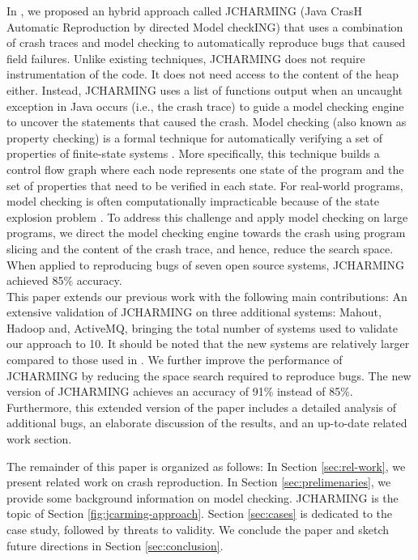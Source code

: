 \documentclass[times]{smrauth}
\begin{document}
In  \cite{Nayrolles2015}, we proposed an hybrid approach called JCHARMING
(Java CrasH Automatic Reproduction by directed Model
checkING) that uses a combination of crash traces and model
checking to automatically reproduce bugs that caused field
failures. Unlike existing techniques, JCHARMING does not
require instrumentation of the code. It does not need access to
the content of the heap either. Instead, JCHARMING uses a
list of functions output when an uncaught exception in Java
occurs (i.e., the crash trace) to guide a model checking engine
to uncover the statements that caused the crash. 
Model checking (also known as property checking) is a formal
technique for automatically verifying a set of properties of
finite-state systems \cite{Baier2008}. More specifically, this technique
builds a control flow graph where each node represents one
state of the program and the set of properties that need to be
verified in each state. For real-world programs, model
checking is often computationally impracticable because of
the state explosion problem \cite{Baier2008}. To address this challenge and
apply model checking on large programs, we direct the model
checking engine towards the crash using program slicing and
the content of the crash trace, and hence, reduce the search
space. When applied to reproducing bugs of seven open source  systems, JCHARMING achieved  85\% accuracy. \\

This paper extends our previous work \cite{Nayrolles2015} with the following main contributions: An extensive validation of JCHARMING on three additional systems: Mahout, Hadoop and, ActiveMQ, bringing the total number of systems used to validate our approach to 10. It should be noted that the new systems are relatively larger compared to those used in \cite{Nayrolles2015}. We further improve the performance of JCHARMING by reducing the space search required to reproduce bugs. The new version of JCHARMING achieves an accuracy of 91\% instead of 85\%. Furthermore, this extended version of the paper  includes a detailed analysis of additional bugs, an elaborate discussion of the results, and an up-to-date related work section.

The remainder of this paper is organized as follows: In Section
\ref{sec:rel-work}, we present related work on crash reproduction. In Section \ref{sec:prelimenaries}, we provide some background information on model
checking. JCHARMING is the topic of Section \ref{fig:jcarming-approach}. Section \ref{sec:cases}
is dedicated to the case study, followed by threats to validity.
We conclude the paper and sketch future directions in Section
\ref{sec:conclusion}.
\end{document}
